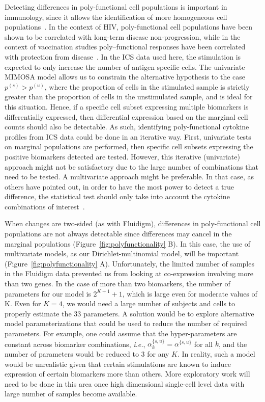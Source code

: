 \documentclass[12pt,oupdraft]{biostatistics}
\begin{document}
Detecting differences in poly-functional cell populations is important in immunology, since it allows the identification of more homogeneous cell populations~\citep{Milush:2009bz}.
In the context of HIV, poly-functional cell populations have been shown to be correlated with long-term disease non-progression, while in the context of vaccination studies poly--functional responses have been correlated with protection from disease~\citep[][e.g.]{Betts:2006dw,Darrah:2007ih,Precopio:2007ht}.
In the ICS data used here, the stimulation is expected to only increase the number of antigen specific cells. The univariate MIMOSA model allows us to constrain the alternative hypothesis to the case $p^{(s)} > p^{(u)}$, where the proportion of cells in the stimulated sample is strictly greater than the proportion of cells in the unstimulated sample, and is ideal for this situation.
Hence, if a specific cell subset expressing multiple biomarkers is differentially expressed, then differential expression based on the marginal cell counts should also be detectable.
As such, identifying poly-functional cytokine profiles from ICS data could be done in an iterative way.
First, univariate tests on marginal populations are performed, then specific cell subsets expressing the positive biomarkers detected are tested.
However, this iterative (univariate) approach might not be satisfactory due to the large number of combinations that need to be tested. A multivariate approach might be preferable.
In that case,  as others have pointed out, in order to have the most power to detect a true difference, the statistical test should only take into account the cytokine combinations of interest~\citep{Nason:2006dx}.

When changes are two-sided (as with Fluidigm), differences in poly-functional cell populations are not always detectable  since differences may cancel in the marginal populations (Figure~\ref{fig:polyfunctionality} B).
In this case, the use of multivariate models, as our Dirichlet-multinomial model, will be important (Figure~\ref{fig:polyfunctionality} A).
Unfortunately, the limited number of samples in the Fluidigm data prevented us from looking at co-expression involving more than two genes.
In the case of more than two biomarkers, the number of parameters for our model is $2^{K+1}+1$, which is large even for moderate values of K. Even for  $K=4$, we would need a large number of subjects and cells to properly estimate the 33 parameters. A solution would be to explore alternative model parameterizations that could be used to reduce the number of required parameters.
For example, one could assume that the hyper-parameters are constant across biomarker combinations, \textit{i.e.}, $\alpha^{\{s,u\}}_{k}=\alpha^{\{s,u\}}$ for all $k$, and the number of parameters would be reduced to $3$ for any $K$.
In reality, such a model would be unrealistic given that certain stimulations are known to induce expression of certain biomarkers more than others.
More exploratory work will need to be done in this area once high dimensional single-cell level data with large number of samples become available.
\end{document}
